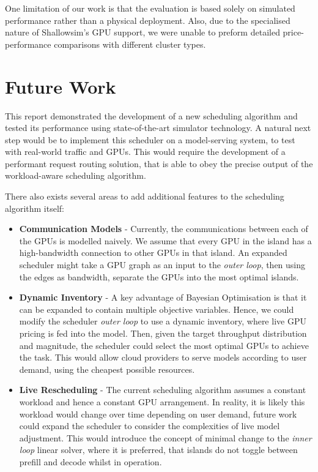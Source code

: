 One limitation of our work is that the evaluation is based solely on simulated performance rather than a physical deployment.
Also, due to the specialised nature of Shallowsim's \autocite{icezack12Icezack12Shallowsim2025} GPU support, we were unable to preform detailed price-performance comparisons with different cluster types.


\origclearpage
\section{Future Work}

This report demonstrated the development of a new scheduling algorithm and tested its performance using state-of-the-art simulator technology.
A natural next step would be to implement this scheduler on a model-serving system, to test with real-world traffic and GPUs.
This would require the development of a performant request routing solution, that is able to obey the precise output of the workload-aware scheduling algorithm.


There also exists several areas to add additional features to the scheduling algorithm itself:

\begin{itemize}

	\item \textbf{Communication Models} - Currently, the communications between each of the GPUs is modelled naively. We assume that every GPU in the island has a high-bandwidth connection to other GPUs in that island. An expanded scheduler might take a GPU graph as an input to the \textit{outer loop}, then using the edges as bandwidth, separate the GPUs into the most optimal islands.

	\item \textbf{Dynamic Inventory} - A key advantage of Bayesian Optimisation is that it can be expanded to contain multiple objective variables. Hence, we could modify the scheduler \textit{outer loop} to use a dynamic inventory, where live GPU pricing is fed into the model. Then, given the target throughput distribution and magnitude, the scheduler could select the most optimal GPUs to achieve the task. This would allow cloud providers to serve models according to user demand, using the cheapest possible resources.

	\item \textbf{Live Rescheduling} - The current scheduling algorithm assumes a constant workload and hence a constant GPU arrangement. In reality, it is likely this workload would change over time depending on user demand, future work could expand the scheduler to consider the complexities of live model adjustment. This would introduce the concept of minimal change to the \textit{inner loop} linear solver, where it is preferred, that islands do not toggle between prefill and decode whilst in operation.

\end{itemize}

\label{lastcontentpage} %